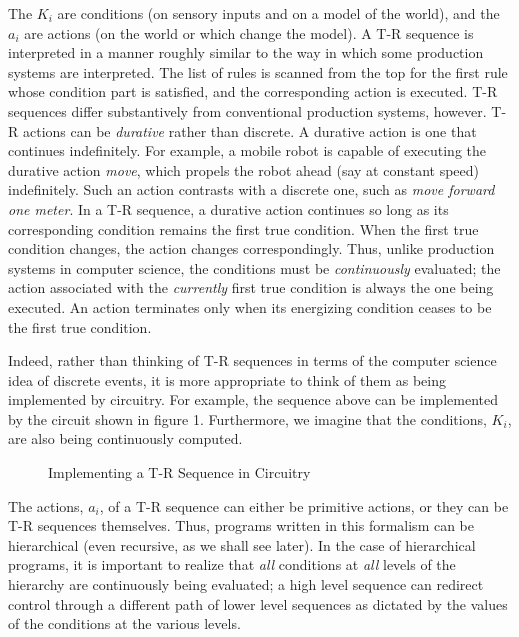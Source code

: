 The $K_i$ are conditions (on sensory inputs and on a model of the world), and  
the $a_i$ are actions (on the world or which change the model).   A T-R  
sequence is interpreted in a manner roughly similar to the way in which some  
production systems are interpreted.  The list of rules is scanned from the  
top for the first rule whose condition part is satisfied, and the  
corresponding action is executed.  T-R sequences differ substantively from  
conventional production systems, however.  T-R actions can be  {\it durative}  
rather than discrete.  A durative action is one that continues indefinitely.   
For example, a mobile robot is capable of executing the durative action {\it  
move}, which propels the robot ahead (say at constant speed) indefinitely.   
Such an action contrasts with a discrete one, such as {\it move forward one  
meter}.   In a T-R sequence, a durative action continues so long as its  
corresponding condition remains the first true condition.  When the first  
true condition changes, the action changes correspondingly. Thus, unlike  
production systems in computer science, the conditions must be {\it  
continuously} evaluated; the action associated with the {\it currently} first  
true condition is always the one being executed.  An action terminates only  
when its energizing condition ceases to be the first true condition.

Indeed, rather than thinking of T-R sequences in terms of the computer  
science idea of discrete events, it is more appropriate to think of them as  
being implemented by circuitry.  For example, the sequence above can be  
implemented by the circuit shown in figure 1.  Furthermore, we imagine that  
the conditions, $K_i$, are also being continuously computed.

\begin{figure}[htb]
\centerline{}
\caption{Implementing a T-R Sequence in Circuitry} 

\end{figure}


The actions, $a_i$, of a T-R sequence can either be primitive actions, or  
they can be T-R sequences themselves.  Thus, programs written in this  
formalism can be hierarchical (even recursive, as we shall see later).  In  
the case of hierarchical programs, it is important to realize that {\it all}  
conditions at {\it all} levels of the hierarchy are continuously being  
evaluated; a high level sequence can redirect control through a different  
path of lower level sequences as dictated by the values of the conditions at  
the various levels.

